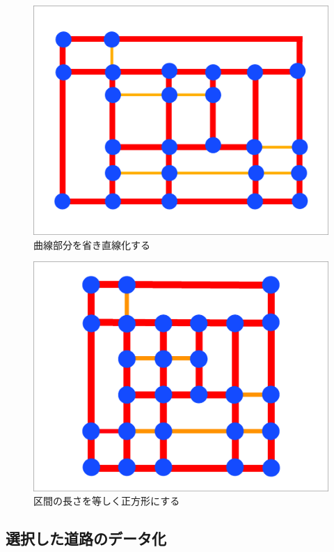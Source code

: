 \begin{figure}[H]
    \centering  %
    \includegraphics[clip,width = 13.0cm]{assets/MAP_4.eps}
    \caption{曲線部分を省き直線化する}  \label{sample}
\end{figure}


\begin{figure}[H]
    \centering  %
    \includegraphics[clip,width = 13.0cm]{assets/MAP_5.eps}
    \caption{区間の長さを等しく正方形にする}  \label{sample}
\end{figure}


\subsection{選択した道路のデータ化}

